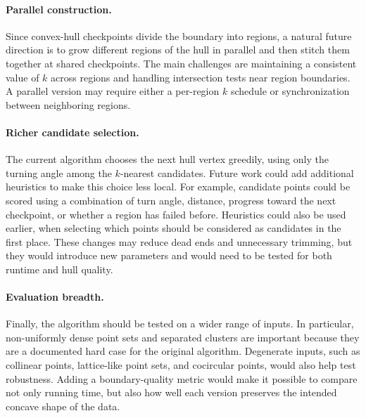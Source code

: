 \documentclass[a4paper,twoside]{article}
\begin{document}
\paragraph{Parallel construction.} Since convex-hull checkpoints divide the boundary into regions, a natural future direction is to grow different regions of the hull in parallel and then stitch them together at shared checkpoints. The main challenges are maintaining a consistent value of \(k\) across regions and handling intersection tests near region boundaries. A parallel version may require either a per-region \(k\) schedule or synchronization between neighboring regions.

\paragraph{Richer candidate selection.} The current algorithm chooses the next hull vertex greedily, using only the turning angle among the \(k\)-nearest candidates. Future work could add additional heuristics to make this choice less local. For example, candidate points could be scored using a combination of turn angle, distance, progress toward the next checkpoint, or whether a region has failed before. Heuristics could also be used earlier, when selecting which points should be considered as candidates in the first place. These changes may reduce dead ends and unnecessary trimming, but they would introduce new parameters and would need to be tested for both runtime and hull quality.

\paragraph{Evaluation breadth.}
Finally, the algorithm should be tested on a wider range of inputs. In particular, non-uniformly dense point sets and separated clusters are important because they are a documented hard case for the original algorithm. Degenerate inputs, such as collinear points, lattice-like point sets, and cocircular points, would also help test robustness. Adding a boundary-quality metric would make it possible to compare not only running time, but also how well each version preserves the intended concave shape of the data.

{\small
}
\end{document}
